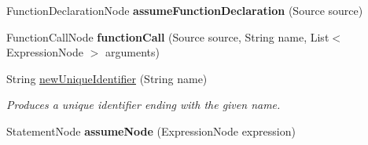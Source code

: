 \begin{DoxyCompactItemize}
\item 
\hypertarget{classedu_1_1udel_1_1cis_1_1vsl_1_1civl_1_1transform_1_1common_1_1BaseWorker_a2479f1dad231f9630460317217835aa5}{}Function\+Declaration\+Node {\bfseries assume\+Function\+Declaration} (Source source)\label{classedu_1_1udel_1_1cis_1_1vsl_1_1civl_1_1transform_1_1common_1_1BaseWorker_a2479f1dad231f9630460317217835aa5}

\item 
\hypertarget{classedu_1_1udel_1_1cis_1_1vsl_1_1civl_1_1transform_1_1common_1_1BaseWorker_a29cf8efbe3009de840fb570fbac30c10}{}Function\+Call\+Node {\bfseries function\+Call} (Source source, String name, List$<$ Expression\+Node $>$ arguments)\label{classedu_1_1udel_1_1cis_1_1vsl_1_1civl_1_1transform_1_1common_1_1BaseWorker_a29cf8efbe3009de840fb570fbac30c10}

\item 
String \hyperlink{classedu_1_1udel_1_1cis_1_1vsl_1_1civl_1_1transform_1_1common_1_1BaseWorker_a5f60ef0a62dac423bbe90567a3063572}{new\+Unique\+Identifier} (String name)
\begin{DoxyCompactList}\small\item\em Produces a unique identifier ending with the given name. \end{DoxyCompactList}\item 
\hypertarget{classedu_1_1udel_1_1cis_1_1vsl_1_1civl_1_1transform_1_1common_1_1BaseWorker_a42a995c22d318ef4656c6ceba306e97c}{}Statement\+Node {\bfseries assume\+Node} (Expression\+Node expression)\label{classedu_1_1udel_1_1cis_1_1vsl_1_1civl_1_1transform_1_1common_1_1BaseWorker_a42a995c22d318ef4656c6ceba306e97c}


\end{DoxyCompactItemize}
